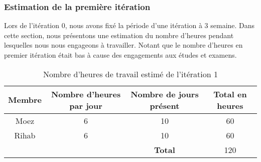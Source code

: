 \subsubsection{Estimation de la première itération}

Lors de l'itération 0, nous avons fixé la période d’une itération à 3 semaine. Dans
cette section, nous présentons une estimation du nombre d’heures pendant lesquelles
nous nous engageons à travailler. Notant que le nombre d'heures en premier
itération était bas à cause des engagements aux études et examens.

\begin{table}[htbp]
    \centering
    \begin{tabular}{| c | c | c | c |}
\hline
\textbf{Membre} & \textbf{Nombre d'heures par jour} & \textbf{Nombre de jours présent} & \textbf{Total en heures} \\ \hline
\hline

Moez & 6 & 10 & 60\\ \hline
Rihab & 6 & 10 & 60 \\ \hline
\multicolumn{2}{c|}{} & \textbf{Total} & 120 \\ \cline{3-4}
    \end{tabular}
    \caption{Nombre d'heures de travail estimé de l'itération 1}
    \label{tab:sprint1-capacity}
\end{table}

